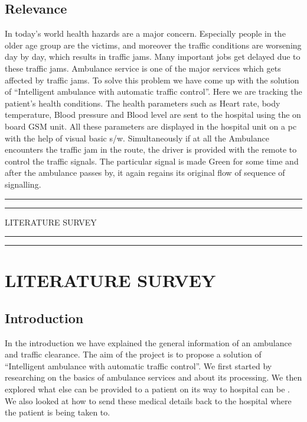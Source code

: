 \documentclass[12pt,a4paper,oneside,openright]{report}
\begin{document}
\section{Relevance}
In today’s world health hazards are a major concern. Especially people in the older age group are the victims, and moreover the traffic conditions are worsening day by day, which results in traffic jams. Many important jobs get delayed due to these traffic jams. Ambulance service is one of the major services which gets affected by traffic jams. To solve this problem we have come up with the solution of “Intelligent ambulance with automatic traffic control”. Here we are tracking the patient’s health conditions. The health parameters such as Heart rate, body temperature, Blood pressure and Blood level are sent to the hospital using the on board GSM unit. All these parameters are displayed in the hospital unit on a pc with the help of visual basic s/w. Simultaneously if at all the Ambulance encounters the traffic jam in the route, the driver is provided with the remote to control the traffic signals. The particular signal is made Green for some time and after the ambulance passes by, it again regains its original flow of sequence of signalling.

\newpage
\vspace*{\fill}
 \begin{center}
\hrule%
\vspace{1pt}%
\hrule
\vspace{1pc}%
\LARGE\MakeUppercase{LITERATURE SURVEY} 
\vspace{1pc}%
\hrule%
\vspace{1pt}%
\hrule
 \end{center}
 \vspace*{\fill}

\chapter{LITERATURE SURVEY}
\section{Introduction}
In the introduction we have explained the general information of an ambulance and traffic clearance. The aim of the project is to propose a solution of “Intelligent ambulance with automatic traffic control”. We first started by researching on the basics of ambulance services and about its processing. We then explored what else can be provided to a patient on its way to hospital can be . We also looked at how to send these medical details back to the hospital where the patient is being taken to.
\end{document}
